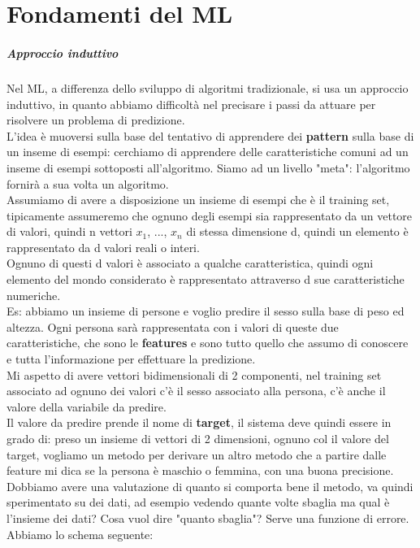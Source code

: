 \documentclass[12pt, oneside]{extbook}
\begin{document}
\chapter{Fondamenti del ML}
\paragraph{Approccio induttivo}
Nel ML, a differenza dello sviluppo di algoritmi tradizionale, si usa un approccio induttivo, in quanto abbiamo difficoltà nel precisare i passi da attuare per risolvere un problema di predizione.\\L'idea è muoversi sulla base del tentativo di apprendere dei \textbf{pattern} sulla base di un inseme di esempi: cerchiamo di apprendere delle caratteristiche comuni ad un inseme di esempi sottoposti all'algoritmo. Siamo ad un livello "meta": l'algoritmo fornirà a sua volta un algoritmo.\\Assumiamo di avere a disposizione un insieme di esempi che è il training set, tipicamente assumeremo che ognuno degli esempi sia rappresentato da un vettore di valori, quindi n vettori $x_1$, ..., $x_n$ di stessa dimensione d, quindi un elemento è rappresentato da d valori reali o interi.\\Ognuno di questi d valori è associato a qualche caratteristica, quindi ogni elemento del mondo considerato è rappresentato attraverso d sue caratteristiche numeriche.\\Es: abbiamo un insieme di persone e voglio predire il sesso sulla base di peso ed altezza. Ogni persona sarà rappresentata con i valori di queste due caratteristiche, che sono le \textbf{features} e sono tutto quello che assumo di conoscere e tutta l'informazione per effettuare la predizione.\\Mi aspetto di avere vettori bidimensionali di 2 componenti, nel training set associato ad ognuno dei valori c'è il sesso associato alla persona, c'è anche il valore della variabile da predire.\\Il valore da predire prende il nome di \textbf{target}, il sistema deve quindi essere in grado di: preso un insieme di vettori di 2 dimensioni, ognuno col il valore del target, vogliamo un metodo per derivare un altro metodo che a partire dalle feature mi dica se la persona è maschio o femmina, con una buona precisione.\\Dobbiamo avere una valutazione di quanto si comporta bene il metodo, va quindi sperimentato su dei dati, ad esempio vedendo quante volte sbaglia ma qual è l'insieme dei dati? Cosa vuol dire "quanto sbaglia"? Serve una funzione di errore.\\Abbiamo lo schema seguente:\\
\end{document}
